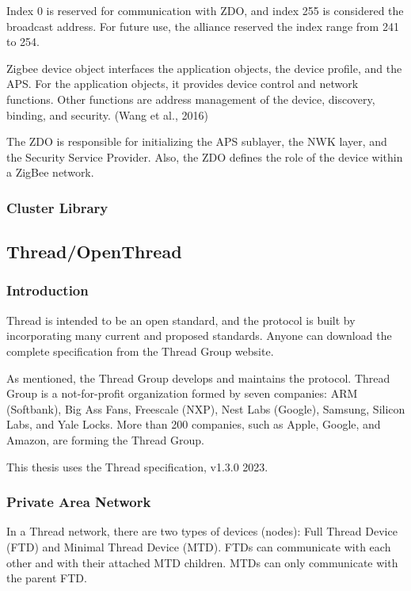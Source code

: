 Index 0 is reserved for communication with ZDO, and index 255 is considered the broadcast address.
For future use, the alliance reserved the index range from 241 to 254.

Zigbee device object interfaces the application objects, the device profile, and the APS. For the application objects, it provides device control and network functions. Other functions are address management of the device, discovery, binding, and security. (Wang et al., 2016)

The ZDO is responsible for initializing the APS sublayer, the NWK layer, and the Security Service Provider. Also, the ZDO defines the role of the device within a ZigBee network.
\subsubsection{Cluster Library}


\subsection{Thread/OpenThread}
\label{sec:ot}

\subsubsection{Introduction}
\label{sec:ot:intro}
Thread is intended to be an open standard, and the protocol is built by incorporating many
current and proposed standards.\cite{unwala:2018}
Anyone can download the complete specification from the Thread Group website. \cite{thread:130}

As mentioned, the Thread Group develops and maintains the protocol.
Thread Group is a not-for-profit organization formed by seven companies:
ARM (Softbank), Big Ass Fans, Freescale (NXP), Nest Labs (Google), Samsung, Silicon Labs, and Yale Locks.
More than 200 companies, such as Apple, Google, and Amazon, are forming the Thread Group. \cite{thread:members}

This thesis uses the Thread specification, v1.3.0 2023.

\subsubsection{Private Area Network}
\label{sec:ot:pan}
In a Thread network, there are two types of devices (nodes): Full Thread Device (FTD) and Minimal Thread Device (MTD). FTDs can communicate with each other and with their attached MTD children. MTDs can only communicate with the parent FTD.

